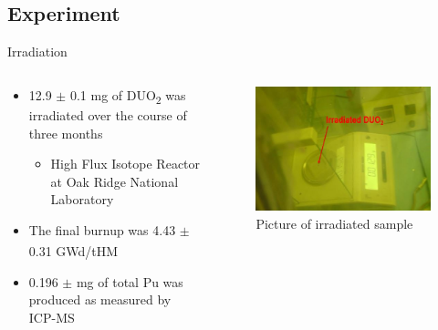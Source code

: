 \documentclass{beamer}
\newcommand{\tss}{\textsuperscript}
\newcommand{\tsbs}{\textsubscript}
\begin{document}
\subsection{Experiment}
\begin{frame}{Irradiation}
  \begin{columns}
    \begin{column}{0.5\textwidth}
      \vspace{-1cm}
      \begin{itemize}
      \item{12.9 $\pm$ 0.1 mg of DUO\tsbs{2} was irradiated over
        the course of three months}
        \begin{itemize}
        \item{High Flux Isotope Reactor at Oak Ridge National Laboratory}
        \end{itemize}
      \item{The final burnup was 4.43 $\pm$ 0.31 GWd/tHM\tss{\cite{swinney2015experimental}}}
      \item{0.196 $\pm$ mg of total Pu was produced as measured by ICP-MS}
      \end{itemize}
    \end{column}
    \begin{column}{0.5\textwidth}
      \begin{figure}[H]
        \vspace*{-1cm}
        \begin{center}
	   \includegraphics[scale = 0.4]{irradiated}
           \caption{\tiny{Picture of irradiated sample}}
	\end{center}
      \end{figure}
    \end{column}
  \end{columns}  
  
\end{frame}
\end{document}
